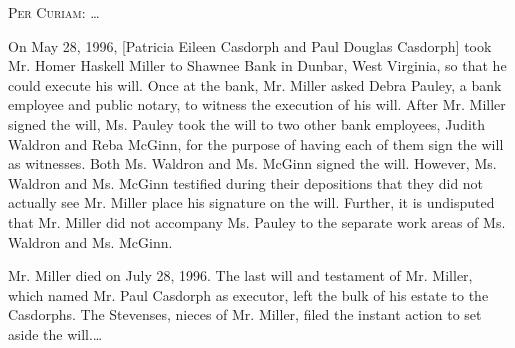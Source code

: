 
\textsc{Per Curiam}: \dots

 On May 28, 1996, [Patricia Eileen Casdorph and Paul Douglas Casdorph] took Mr.
Homer Haskell Miller to Shawnee Bank in Dunbar, West Virginia, so that he could
execute his will. Once at the bank, Mr. Miller asked Debra Pauley, a bank
employee and public notary, to witness the execution of his will. After Mr.
Miller signed the will, Ms. Pauley took the will to two other bank employees,
Judith Waldron and Reba McGinn, for the purpose of having each of them sign the
will as witnesses. Both Ms. Waldron and Ms. McGinn signed the will. However,
Ms. Waldron and Ms. McGinn testified during their depositions that they did not
actually see Mr. Miller place his signature on the will. Further, it is
undisputed that Mr. Miller did not accompany Ms. Pauley to the separate work
areas of Ms. Waldron and Ms. McGinn. 

Mr. Miller died on July 28, 1996. The last will and testament of Mr. Miller,
which named Mr. Paul Casdorph as executor, left the bulk of his estate to the
Casdorphs. The Stevenses, nieces of Mr. Miller, filed the instant action to set
aside the will.\ldots\unskip{} 

